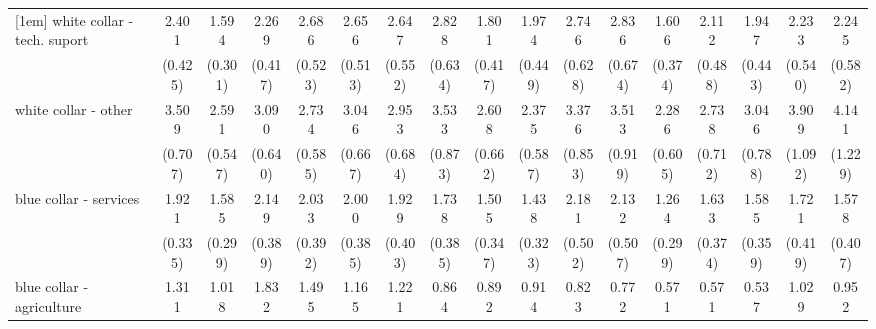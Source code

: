 {\begin{tabular}{l*{16}{c}}
[1em]
white collar - tech. suport&       2.401\sym{***}&       1.594\sym{*}  &       2.269\sym{***}&       2.686\sym{***}&       2.656\sym{***}&       2.647\sym{***}&       2.828\sym{***}&       1.801\sym{*}  &       1.974\sym{**} &       2.746\sym{***}&       2.836\sym{***}&       1.606\sym{*}  &       2.112\sym{**} &       1.947\sym{**} &       2.233\sym{***}&       2.245\sym{**} \\
                    &     (0.425)         &     (0.301)         &     (0.417)         &     (0.523)         &     (0.513)         &     (0.552)         &     (0.634)         &     (0.417)         &     (0.449)         &     (0.628)         &     (0.674)         &     (0.374)         &     (0.488)         &     (0.443)         &     (0.540)         &     (0.582)         \\
[1em]
white collar - other&       3.509\sym{***}&       2.591\sym{***}&       3.090\sym{***}&       2.734\sym{***}&       3.046\sym{***}&       2.953\sym{***}&       3.533\sym{***}&       2.608\sym{***}&       2.375\sym{***}&       3.376\sym{***}&       3.513\sym{***}&       2.286\sym{**} &       2.738\sym{***}&       3.046\sym{***}&       3.909\sym{***}&       4.141\sym{***}\\
                    &     (0.707)         &     (0.547)         &     (0.640)         &     (0.585)         &     (0.667)         &     (0.684)         &     (0.873)         &     (0.662)         &     (0.587)         &     (0.853)         &     (0.919)         &     (0.605)         &     (0.712)         &     (0.788)         &     (1.092)         &     (1.229)         \\
[1em]
blue collar - services&       1.921\sym{***}&       1.585\sym{*}  &       2.149\sym{***}&       2.033\sym{***}&       2.000\sym{***}&       1.929\sym{**} &       1.738\sym{*}  &       1.505         &       1.438         &       2.181\sym{***}&       2.132\sym{**} &       1.264         &       1.633\sym{*}  &       1.585\sym{*}  &       1.721\sym{*}  &       1.578         \\
                    &     (0.335)         &     (0.299)         &     (0.389)         &     (0.392)         &     (0.385)         &     (0.403)         &     (0.385)         &     (0.347)         &     (0.323)         &     (0.502)         &     (0.507)         &     (0.299)         &     (0.374)         &     (0.359)         &     (0.419)         &     (0.407)         \\
[1em]
blue collar - agriculture&       1.311         &       1.018         &       1.832\sym{*}  &       1.495         &       1.165         &       1.221         &       0.864         &       0.892         &       0.914         &       0.823         &       0.772         &       0.571         &       0.571         &       0.537         &       1.029         &       0.952         \\

\end{tabular}}
